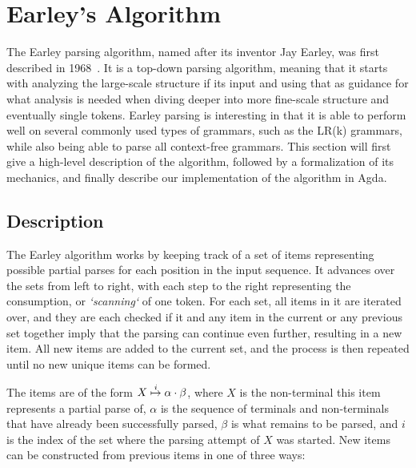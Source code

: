 \chapter{Earley's Algorithm} \label{Earleys}

	The Earley parsing algorithm, named after its inventor Jay Earley, was
	first described in 1968~\cite{Earley}. It is a top-down parsing algorithm,
	meaning that it starts with analyzing the large-scale structure if its
	input and using that as guidance for what analysis is needed when diving
	deeper into more fine-scale structure and eventually single tokens.  Earley
	parsing is interesting in that it is able to perform well on several
	commonly used types of grammars, such as the LR(k) grammars, while also
	being able to parse all context-free grammars. This section will first give
	a high-level description of the algorithm, followed by a formalization of
	its mechanics, and finally describe our implementation of the algorithm in
	Agda.

	\section{Description}

		The Earley algorithm works by keeping track of a set of items
		representing possible partial parses for each position in the input
		sequence. It advances over the sets from left to right, with each step
		to the right representing the consumption, or \emph{`scanning`} of one
		token. For each set, all items in it are iterated over, and they are
		each checked if it and any item in the current or any previous set
		together imply that the parsing can continue even further, resulting in
		a new item. All new items are added to the current set, and the process
		is then repeated until no new unique items can be formed.

		The items are of the form $X\overset{i}{\mapsto}\alpha\cdot\beta$, where
		$X$ is the non-terminal this item represents a partial parse of,
		$\alpha$ is the sequence of terminals and non-terminals that have
		already been successfully parsed, $\beta$ is what remains to be parsed,
		and $i$ is the index of the set where the parsing attempt of $X$ was
		started. New items can be constructed from previous items in one of
		three ways:


